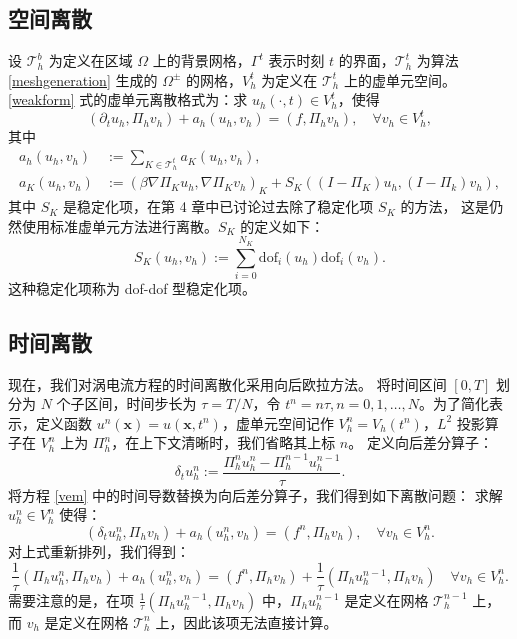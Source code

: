 \subsection{空间离散}
设 $\mathcal{T}_h^b$ 为定义在区域 $\Omega$ 上的背景网格，$\Gamma^t$ 表示时刻 $t$
的界面，$\mathcal{T}_h^t$ 为算法 \ref{meshgeneration} 生成的 $\Omega^{\pm}$
的网格，$V_h^t$ 为定义在 $\mathcal{T}_h^t$ 上的虚单元空间。
\eqref{weakform} 式的虚单元离散格式为：求 $u_h(\cdot, t) \in V_h^t$，使得
\begin{equation}
\label{vem}
(\partial_t u_h, \Pi_h v_h) + a_h(u_h, v_h) = (f, \Pi_h v_h), \quad \forall v_h
\in V_h^t,
\end{equation}
其中
\begin{align}
    a_h(u_h, v_h) & := \sum_{K\in \mathcal{T}_h^t} a_K(u_h, v_h), \\
    a_K(u_h, v_h) & := (\beta\nabla \Pi_K u_h, \nabla \Pi_K v_h)_{K}
    + S_K( (I-\Pi_K) u_h, (I-\Pi_k)v_h),
\end{align}
其中 $S_K$ 是稳定化项，在第 4 章中已讨论过去除了稳定化项 $S_K$ 的方法，
这是仍然使用标准虚单元方法进行离散。$S_K$ 的定义如下：
$$
S_K(u_h, v_h) := \sum_{i = 0}^{N_K} \text{dof}_i(u_h) \text{dof}_i(v_h).
$$
这种稳定化项称为 dof-dof 型稳定化项。%

\subsection{时间离散}
\label{timediscretization}
现在，我们对涡电流方程的时间离散化采用向后欧拉方法。
将时间区间 $[0, T]$ 划分为 $N$ 个子区间，时间步长为 $\tau = T/N$，令 $t^n =
n\tau, n = 0, 1, \dots, N$。为了简化表示，定义函数 $u^n(\boldsymbol{x}) =
u(\boldsymbol{x}, t^n)$，虚单元空间记作 $V_h^n = V_h(t^n)$，$L^2$ 投影算子在 $V_h^n$ 上为 $\Pi_h^n$，在上下文清晰时，我们省略其上标 $n$。
定义向后差分算子：
$$
\delta_t u_h^n := \frac{\Pi_h^nu_h^n - \Pi_h^{n-1} u_h^{n-1}}{\tau}.
$$
将方程 \eqref{vem} 中的时间导数替换为向后差分算子，我们得到如下离散问题：
求解 $u_h^n \in V_h^n$ 使得：
\begin{equation}
\label{VEMdiscrete}
(\delta_t u_h^n, \Pi_h v_h) + a_h(u_h^n, v_h) = (f^n,\Pi_h v_h),
\quad \forall v_h \in V_h^n.
\end{equation}
对上式重新排列，我们得到：
\begin{equation}
\label{VEMdiscrete2}
\frac{1}{\tau}( \Pi_h u_h^n,\Pi_h v_h) + a_h(u_h^n, v_h) =
(f^n, \Pi_h v_h) + \frac{1}{\tau}(\Pi_h u_h^{n-1},\Pi_h v_h)
\quad \forall v_h \in V_h^n.
\end{equation}
需要注意的是，在项 $\frac{1}{\tau}( \Pi_h u_h^{n-1}, \Pi_h v_h)$ 中，$\Pi_h u_h^{n-1}$ 是定义在网格 $\mathcal{T}_h^{n-1}$ 上，而 $v_h$ 是定义在网格 $\mathcal{T}_h^n$ 上，因此该项无法直接计算。

